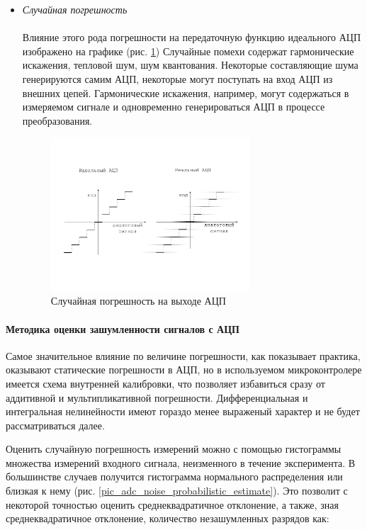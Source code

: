 \begin{itemize}
    \item \textit{Случайная погрешность} \\ \\
        Влияние этого рода погрешности на передаточную функцию идеального АЦП изображено на графике
        (рис. \ref{pic_adc_code_transition_noise})
        Случайные помехи содержат гармонические искажения, тепловой шум, шум квантования.
        Некоторые составляющие шума генерируются самим АЦП, некоторые могут поступать на вход АЦП
        из внешних цепей. Гармонические искажения, например, могут содержаться в измеряемом сигнале
        и одновременно генерироваться АЦП в процессе преобразования.

        \begin{figure}[!ht]
            \centering
            \includegraphics[width=0.7\textwidth, keepaspectratio, clip=true, trim=5mm 35mm 5mm 35mm]
                            {./src/pictures/adc_code_transition_noise}
            \caption{Случайная погрешность на выходе АЦП}
            \label{pic_adc_code_transition_noise}
        \end{figure}
\end{itemize}

\paragraph{Методика оценки зашумленности сигналов с АЦП}
Самое значительное влияние по величине погрешности, как показывает практика, оказывают статические
погрешности в АЦП, но в используемом микроконтролере имеется схема внутренней калибровки, что позволяет
избавиться сразу от аддитивной и мультипликативной погрешности. Дифференциальная и интегральная
нелинейности имеют гораздо менее выраженый характер и не будет рассматриваться далее.

Оценить случайную погрешность измерений можно с помощью гистограммы множества измерений
входного сигнала, неизменного в течение эксперимента. В большинстве случаев получится
гистограмма нормального распределения или близкая к нему
(рис. \ref{pic_adc_noise_probabilistic_estimate}). Это позволит с некоторой точностью
оценить среднеквадратичное отклонение, а также, зная среднеквадратичное отклонение, количество
незашумленных разрядов как:

